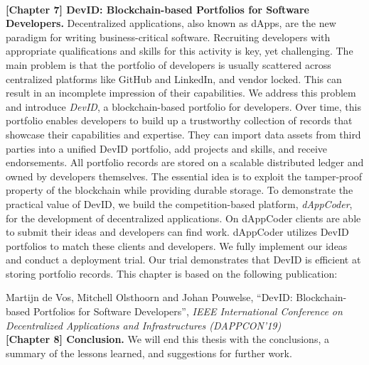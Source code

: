 \\

\textbf{[Chapter 7] DevID: Blockchain-based Portfolios for Software Developers.}
Decentralized applications, also known as dApps, are the new paradigm for writing business-critical software.
Recruiting developers with appropriate qualifications and skills for this activity is key, yet challenging.
The main problem is that the portfolio of developers is usually scattered across centralized platforms like GitHub and LinkedIn, and vendor locked.
This can result in an incomplete impression of their capabilities.
We address this problem and introduce \emph{DevID}, a blockchain-based portfolio for developers.
Over time, this portfolio enables developers to build up a trustworthy collection of records that showcase their capabilities and expertise.
They can import data assets from third parties into a unified DevID portfolio, add projects and skills, and receive endorsements.
All portfolio records are stored on a scalable distributed ledger and owned by developers themselves.
The essential idea is to exploit the tamper-proof property of the blockchain while providing durable storage.
To demonstrate the practical value of DevID, we build the competition-based platform, \emph{dAppCoder}, for the development of decentralized applications.
On dAppCoder clients are able to submit their ideas and developers can find work.
dAppCoder utilizes DevID portfolios to match these clients and developers.
We fully implement our ideas and conduct a deployment trial.
Our trial demonstrates that DevID is efficient at storing portfolio records.
This chapter is based on the following publication:

Martijn de Vos, Mitchell Olsthoorn and Johan Pouwelse, \enquote{DevID: Blockchain-based Portfolios for Software Developers}, \emph{IEEE International Conference on Decentralized Applications and Infrastructures (DAPPCON'19)}\\

\textbf{[Chapter 8] Conclusion.} We will end this thesis with the conclusions, a summary of the lessons learned, and suggestions for further work.

\newpage


